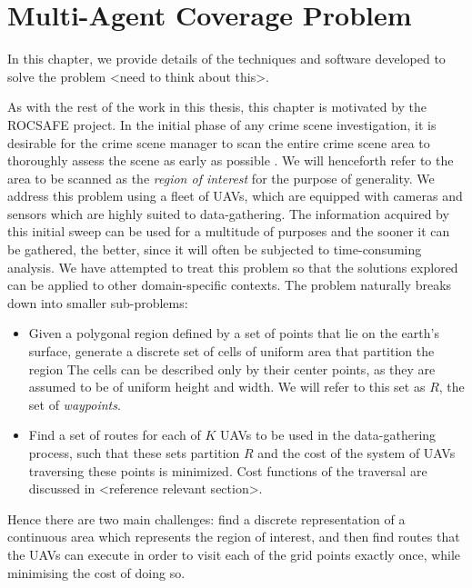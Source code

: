\chapter{Multi-Agent Coverage Problem}
In this chapter, we provide details of the techniques and software developed to solve the problem <need to think about this>.

As with the rest of the work in this thesis, this chapter is motivated by the ROCSAFE project. In the initial phase of any crime scene investigation, it is desirable for the crime scene manager to scan the entire crime scene area to thoroughly assess the scene as early as possible \cite{TechnicalWorkingGrouponCrimeSceneInvestigation2013CrimeEnforcement}. We will henceforth refer to the area to be scanned as the \textit{region of interest} for the purpose of generality. We address this problem using a fleet of UAVs, which are equipped with cameras and sensors which are highly suited to data-gathering. The information acquired by this initial sweep can be used for a multitude of purposes and the sooner it can be gathered, the better, since it will often be subjected to time-consuming analysis. We have attempted to treat this problem so that the solutions explored can be applied to other domain-specific contexts. The problem naturally breaks down into smaller sub-problems:
\begin{itemize}
    \item Given a polygonal region defined by a set of points that lie on the earth's surface, generate a discrete set of cells of uniform area that partition the region 
    The cells can be described only by their center points, as they are assumed to be of uniform height and width. We will refer to this set as $R$, the set of \textit{waypoints}.
    \item Find a set of routes for each of $K$ UAVs to be used in the data-gathering process, such that these sets partition $R$ and the cost of the system of UAVs traversing these points is minimized. Cost functions of the traversal are discussed in <reference relevant section>.
\end{itemize}

Hence there are two main challenges: find a discrete representation of a continuous area which represents the region of interest, and then find routes that the UAVs can execute in order to visit each of the grid points exactly once, while minimising the cost of doing so.






